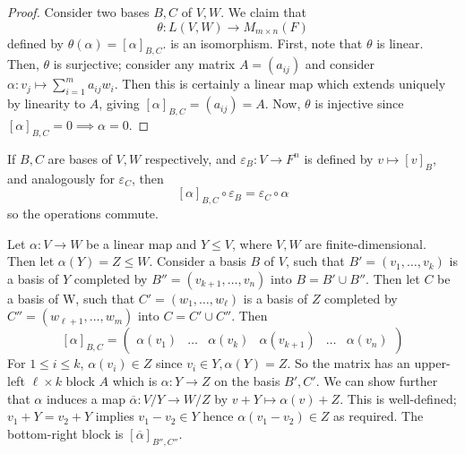 \begin{proof}
	Consider two bases \( B, C \) of \( V, W \).
	We claim that
	\[
		\theta \colon L(V,W) \to M_{m \times n}(F)
	\]
	defined by \( \theta(\alpha) = [\alpha]_{B,C} \).
	is an isomorphism.
	First, note that \( \theta \) is linear.
	Then, \( \theta \) is surjective; consider any matrix \( A = (a_{ij}) \) and consider \( \alpha \colon v_j \mapsto \sum_{i=1}^m a_{ij} w_i \).
	Then this is certainly a linear map which extends uniquely by linearity to \( A \), giving \( [\alpha]_{B,C} = (a_{ij}) = A \).
	Now, \( \theta \) is injective since \( [\alpha]_{B,C} = 0 \implies \alpha = 0 \).
\end{proof}
\begin{remark}
	If \( B,C \) are bases of \( V,W \) respectively, and \( \varepsilon_B \colon V \to F^n \) is defined by \( v \mapsto [v]_B \), and analogously for \( \varepsilon_C \), then
	\[
		[\alpha]_{B,C} \circ \varepsilon_B = \varepsilon_C \circ \alpha
	\]
	so the operations commute.
\end{remark}
\begin{example}
	Let \( \alpha \colon V \to W \) be a linear map and \( Y \leq V \), where \( V, W \) are finite-dimensional.
	Then let \( \alpha(Y) = Z \leq W \).
	Consider a basis \( B \) of \( V \), such that \( B' = (v_1, \dots, v_k) \) is a basis of \( Y \) completed by \( B'' = (v_{k+1}, \dots, v_n) \) into \( B = B' \cup B'' \).
	Then let \( C \) be a basis of W, such that \( C' = (w_1, \dots, w_\ell) \) is a basis of \( Z \) completed by \( C'' = (w_{\ell + 1}, \dots, w_m) \) into \( C = C' \cup C'' \).
	Then
	\[
		[\alpha]_{B,C} = \begin{pmatrix}
			\alpha(v_1) & \dots & \alpha(v_k) & \alpha(v_{k+1}) & \dots & \alpha(v_n)
		\end{pmatrix}
	\]
	For \( 1 \leq i \leq k \), \( \alpha(v_i) \in Z \) since \( v_i \in Y, \alpha(Y) = Z \).
	So the matrix has an upper-left \( \ell \times k \) block \( A \) which is \( \alpha \colon Y \to Z \) on the basis \( B', C' \).
	We can show further that \( \alpha \) induces a map \( \overline{\alpha} \colon V / Y \to W / Z \) by \( v + Y \mapsto \alpha(v) + Z \).
	This is well-defined; \( v_1 + Y = v_2 + Y \) implies \( v_1 - v_2 \in Y \) hence \( \alpha(v_1 - v_2) \in Z \) as required.
	The bottom-right block is \( [\overline{\alpha}]_{B'', C''} \).
\end{example}

